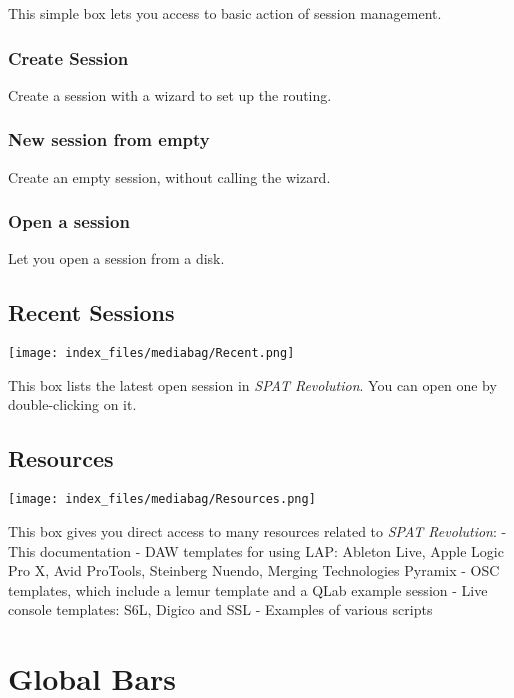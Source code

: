 \documentclass[
  letterpaper,
  DIV=11,
  numbers=noendperiod]{scrreport}
\begin{document}
This simple box lets you access to basic action of session management.

\hypertarget{create-session}{%
\subsection{Create Session}\label{create-session}}

Create a session with a wizard to set up the routing.

\hypertarget{new-session-from-empty}{%
\subsection{New session from empty}\label{new-session-from-empty}}

Create an empty session, without calling the wizard.

\hypertarget{open-a-session}{%
\subsection{Open a session}\label{open-a-session}}

Let you open a session from a disk.

\hypertarget{recent-sessions}{%
\section{Recent Sessions}\label{recent-sessions}}

\texttt{[image: index\_files/mediabag/Recent.png]}

This box lists the latest open session in \emph{SPAT Revolution}. You
can open one by double-clicking on it.

\hypertarget{resources}{%
\section{Resources}\label{resources}}

\texttt{[image: index\_files/mediabag/Resources.png]}

This box gives you direct access to many resources related to \emph{SPAT
Revolution}: - This documentation - DAW templates for using LAP: Ableton
Live, Apple Logic Pro X, Avid ProTools, Steinberg Nuendo, Merging
Technologies Pyramix - OSC templates, which include a lemur template and
a QLab example session - Live console templates: S6L, Digico and SSL -
Examples of various scripts

\hypertarget{global-bars}{%
\chapter{Global Bars}\label{global-bars}}
\end{document}
